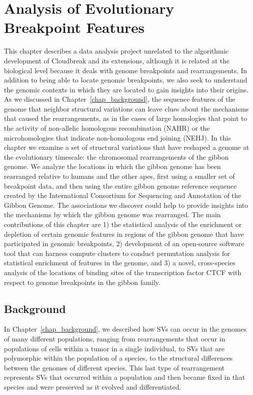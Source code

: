 \chapter{Analysis of Evolutionary Breakpoint Features}
\label{chap_breakpoint_analysis}

This chapter describes a data analysis project unrelated to the algorithmic development of Cloudbreak and its extensions, although it is related at the biological level because it deals with genome breakpoints and rearrangements. In addition to being able to locate genomic breakpoints, we also seek to understand the genomic contexts in which they are located to gain insights into their origins. As we discussed in Chapter~\ref{chap_background}, the sequence features of the genome that neighbor structural variations can leave clues about the mechanisms that caused the rearrangements, as in the cases of large homologies that point to the activity of non-allelic homologous recombination (NAHR) or the microhomologies that indicate non-homologous end joining (NEHJ). In this chapter we examine a set of structural variations that have reshaped a genome at the evolutionary timescale: the chromosomal rearrangements of the gibbon genome. We analyze the locations in which the gibbon genome has been rearranged relative to humans and the other apes, first using a smaller set of breakpoint data, and then using the entire gibbon genome reference sequence created by the International Consortium for Sequencing and Annotation of the Gibbon Genome. The associations we discover could help to provide insights into the mechanisms by which the gibbon genome was rearranged. The main contributions of this chapter are 1) the statistical analysis of the enrichment or depletion of certain genomic features in regions of the gibbon genome that have participated in genomic breakpoints, 2) development of an open-source software tool that can harness compute clusters to conduct permutation analysis for statistical enrichment of features in the genome, and 3) a novel, cross-species analysis of the locations of binding sites of the transcription factor CTCF with respect to genome breakpoints in the gibbon family.

\section{Background}

In Chapter~\ref{chap_background}, we described how SVs can occur in the genomes of many different populations, ranging from rearrangements that occur in populations of cells within a tumor in a single individual, to SVs that are polymorphic within the population of a species, to the structural differences between the genomes of different species. This last type of rearrangement represents SVs that occurred within a population and then became fixed in that species and were preserved as it evolved and differentiated. 

